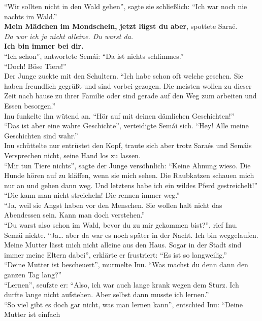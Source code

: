 \documentclass[a4paper,12pt]{book}
\begin{document}
``Wir sollten nicht in den Wald gehen'', sagte sie schließlich: ``Ich war noch nie nachts im 
Wald.''\\
\textbf{Mein Mädchen im Mondschein, jetzt lügst du aber}, spottete Saraé.\\
\textit{Da war ich ja nicht alleine. Du warst da.}\\
\textbf{Ich bin immer bei dir.}\\
``Ich schon'', antwortete Semái: ``Da ist nichts schlimmes.''\\
``Doch! Böse Tiere!''\\
Der Junge zuckte mit den Schultern. ``Ich habe schon oft welche gesehen. Sie haben freundlich 
gegrüßt und sind vorbei gezogen. Die meisten wollen zu dieser Zeit nach hause zu ihrer Familie oder 
sind gerade auf den Weg zum arbeiten und Essen besorgen.''\\
Inu funkelte ihn wütend an. ``Hör auf mit deinen dämlichen Geschichten!''\\
``Das ist aber eine wahre Geschichte'', verteidigte Semái sich. ``Hey! Alle meine Geschichten sind 
wahr.''\\
Inu schüttelte nur entrüstet den Kopf, traute sich aber trotz Saraés und Semáis Versprechen nicht, 
seine Hand los zu lassen. \\
``Mir tun Tiere nichts'', sagte der Junge versöhnlich: ``Keine Ahnung wieso. Die Hunde hören auf zu 
kläffen, wenn sie mich sehen. Die Raubkatzen schauen mich nur an und gehen dann weg. Und letztens 
habe ich ein wildes Pferd gestreichelt!''\\
``Die kann man nicht streicheln! Die rennen immer weg.''\\
``Ja, weil sie Angst haben vor den Menschen. Sie wollen halt nicht das Abendessen sein. Kann man 
doch verstehen.''\\
``Du warst also schon im Wald, bevor du zu mir gekommen bist?'', rief Inu.\\
Semái nickte. ``Ja… aber da war es noch später in der Nacht. Ich bin weggelaufen. Meine Mutter 
lässt mich nicht alleine aus den Haus. Sogar in der Stadt sind immer meine Eltern dabei'', erklärte 
er frustriert: ``Es ist so langweilig.''\\
``Deine Mutter ist bescheuert'', murmelte Inu. ``Was machst du denn dann den ganzen Tag lang?''\\
``Lernen'', seufzte er: ``Also, ich war auch lange krank wegen dem Sturz. Ich durfte lange nicht 
aufstehen. Aber selbst dann musste ich lernen.''\\
``So viel gibt es doch gar nicht, was man lernen kann'', entschied Inu: ``Deine Mutter ist einfach 
\end{document}
